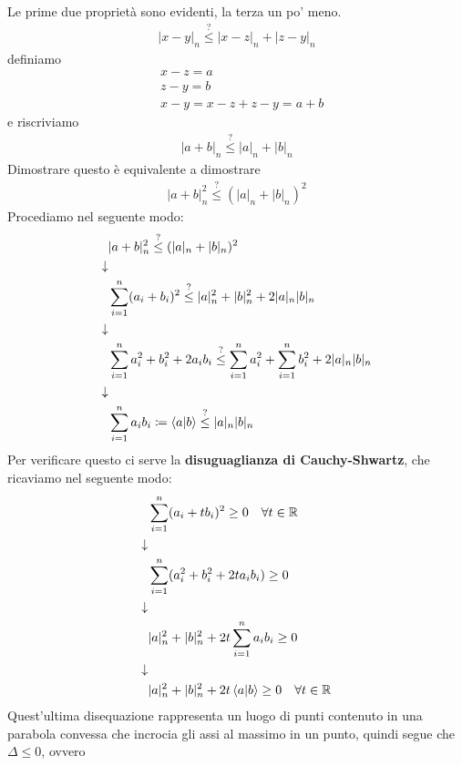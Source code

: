 Le prime due proprietà sono evidenti, la terza un po' meno.
\begin{align}
|x-y|_n \overset{?}{\leq}  |x-z|_n + |z-y|_n
\end{align}
definiamo
\begin{align}
{}&x-z = a \\
&z-y = b \\
&x-y = x-z + z-y = a + b
\end{align}
e riscriviamo
\begin{align}
|a+b|_n \overset{?}{\leq} |a|_n + |b|_n
\end{align}
Dimostrare questo è equivalente a dimostrare
\begin{align}
|a+b|_n^2 \overset{?}{\leq} (|a|_n + |b|_n)^2
\end{align}
Procediamo nel seguente modo:
\begin{align}
{}&|a+b|_n^2 \overset{?}{\leq} (|a|_n + |b|_n)^2 \nonumber \\
\downarrow \nonumber \\
&\sum_{i=1}^{n} (a_i + b_i)^2  \overset{?}{\leq} |a|^2_n + |b|^2_n + 2|a|_n|b|_n \nonumber \\
\downarrow \nonumber \\
&\sum_{i=1}^{n} a_i^2 + b_i^2 + 2a_ib_i \overset{?}{\leq} \sum_{i=1}^{n} a_i^2 + \sum_{i=1}^{n} b_i^2 + 2|a|_n|b|_n \nonumber \\
\downarrow \nonumber \\
&\sum_{i=1}^{n} a_ib_i \coloneqq \braket{a|b} \overset{?}{\leq} |a|_n|b|_n
\end{align}
Per verificare questo ci serve la \textbf{disuguaglianza di Cauchy-Shwartz}, che ricaviamo nel seguente modo:
\begin{align}
{}&\sum_{i=1}^{n} (a_i + t b_i)^2 \geq 0 \quad \forall t \in \mathbb{R} \nonumber \\
\downarrow \nonumber \\
& \sum_{i=1}^{n}(a_i^2 + b_i^2 + 2ta_ib_i ) \geq 0 \nonumber \\
\downarrow \nonumber \\
& |a|^2_n + |b|^2_n + 2t \sum_{i=1}^{n} a_ib_i \geq 0 \nonumber \\
\downarrow \nonumber \\
& |a|^2_n + |b|^2_n + 2t \braket{a|b} \geq 0 \quad \forall t\in \mathbb{R}
\end{align}
Quest'ultima disequazione rappresenta un luogo di punti contenuto in una parabola convessa che incrocia gli assi al massimo in un punto, quindi segue che $\Delta \leq 0$, ovvero


